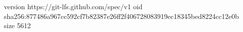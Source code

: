 version https://git-lfs.github.com/spec/v1
oid sha256:877486a967cc592cf7b82387e26ff2f406728083919ec18345bed8224cc12e0b
size 5612
